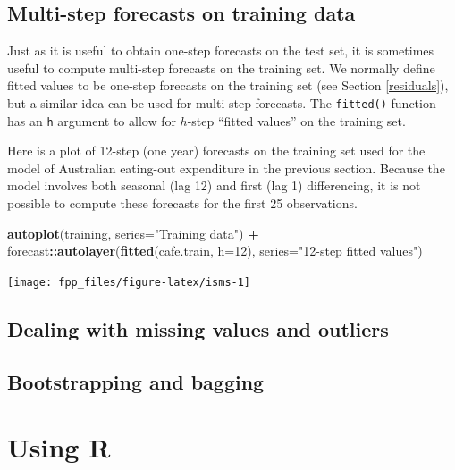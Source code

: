 \documentclass[]{book}
\newenvironment{Shaded}{\begin{snugshade}}{\end{snugshade}}
\newcommand{\DataTypeTok}[1]{\textcolor[rgb]{0.13,0.29,0.53}{#1}}
\newcommand{\DecValTok}[1]{\textcolor[rgb]{0.00,0.00,0.81}{#1}}
\newcommand{\KeywordTok}[1]{\textcolor[rgb]{0.13,0.29,0.53}{\textbf{#1}}}
\newcommand{\NormalTok}[1]{#1}
\newcommand{\OperatorTok}[1]{\textcolor[rgb]{0.81,0.36,0.00}{\textbf{#1}}}
\newcommand{\StringTok}[1]{\textcolor[rgb]{0.31,0.60,0.02}{#1}}
\begin{document}
\hypertarget{isms}{%
\section{Multi-step forecasts on training data}\label{isms}}

Just as it is useful to obtain one-step forecasts on the test set, it is sometimes useful to compute multi-step forecasts on the training set. We normally define fitted values to be one-step forecasts on the training set (see Section \ref{residuals}), but a similar idea can be used for multi-step forecasts. The \texttt{fitted()} function has an \texttt{h} argument to allow for \(h\)-step ``fitted values'' on the training set.

Here is a plot of 12-step (one year) forecasts on the training set used for the model of Australian eating-out expenditure in the previous section. Because the model involves both seasonal (lag 12) and first (lag 1) differencing, it is not possible to compute these forecasts for the first 25 observations.

\begin{Shaded}
\begin{Highlighting}[]
\KeywordTok{autoplot}\NormalTok{(training, }\DataTypeTok{series=}\StringTok{"Training data"}\NormalTok{) }\OperatorTok{+}
\StringTok{  }\NormalTok{forecast}\OperatorTok{::}\KeywordTok{autolayer}\NormalTok{(}\KeywordTok{fitted}\NormalTok{(cafe.train, }\DataTypeTok{h=}\DecValTok{12}\NormalTok{), }\DataTypeTok{series=}\StringTok{"12-step fitted values"}\NormalTok{)}
\end{Highlighting}
\end{Shaded}

\begin{center}\texttt{[image: fpp\_files/figure-latex/isms-1]} \end{center}

\hypertarget{missing-outliers}{%
\section{Dealing with missing values and outliers}\label{missing-outliers}}

\hypertarget{bootstrap}{%
\section{Bootstrapping and bagging}\label{bootstrap}}

\hypertarget{using-r}{%
\chapter*{Using R}\label{using-r}}
\end{document}
